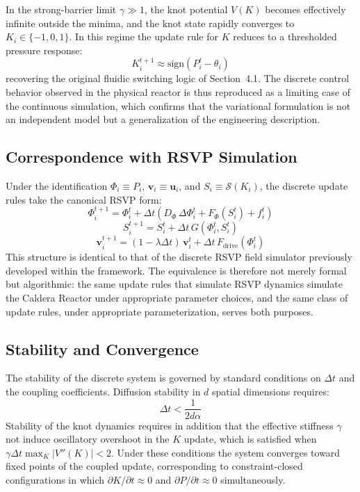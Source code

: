 \documentclass[12pt, a4paper]{article}
\begin{document}
In the strong-barrier limit $\gamma \gg 1$, the knot potential $V(K)$ becomes effectively infinite outside the minima, and the knot state rapidly converges to $K_i \in \{-1, 0, 1\}$. In this regime the update rule for $K$ reduces to a thresholded pressure response:
\[
K_i^{t+1} \approx \mathrm{sign}(P_i^t - \theta_i)
\]
recovering the original fluidic switching logic of Section~4.1. The discrete control behavior observed in the physical reactor is thus reproduced as a limiting case of the continuous simulation, which confirms that the variational formulation is not an independent model but a generalization of the engineering description.

\subsection{Correspondence with RSVP Simulation}

Under the identification $\Phi_i \equiv P_i$, $\mathbf{v}_i \equiv \mathbf{u}_i$, and $S_i \equiv \mathcal{S}(K_i)$, the discrete update rules take the canonical RSVP form:
\[
\Phi_i^{t+1} = \Phi_i^t + \Delta t \left( D_\Phi\, \Delta \Phi_i^t + F_\Phi(S_i^t) + f_i^t \right)
\]
\[
S_i^{t+1} = S_i^t + \Delta t\, G(\Phi_i^t, S_i^t)
\]
\[
\mathbf{v}_i^{t+1} = (1 - \lambda \Delta t)\, \mathbf{v}_i^t + \Delta t\, F_{\text{drive}}(\Phi_i^t)
\]
This structure is identical to that of the discrete RSVP field simulator previously developed within the framework. The equivalence is therefore not merely formal but algorithmic: the same update rules that simulate RSVP dynamics simulate the Caldera Reactor under appropriate parameter choices, and the same class of update rules, under appropriate parameterization, serves both purposes.

\subsection{Stability and Convergence}

The stability of the discrete system is governed by standard conditions on $\Delta t$ and the coupling coefficients. Diffusion stability in $d$ spatial dimensions requires:
\[
\Delta t < \frac{1}{2d\alpha}
\]
Stability of the knot dynamics requires in addition that the effective stiffness $\gamma$ not induce oscillatory overshoot in the $K$ update, which is satisfied when $\gamma \Delta t \max_K |V''(K)| < 2$. Under these conditions the system converges toward fixed points of the coupled update, corresponding to constraint-closed configurations in which $\partial K / \partial t \approx 0$ and $\partial P / \partial t \approx 0$ simultaneously.
\end{document}
